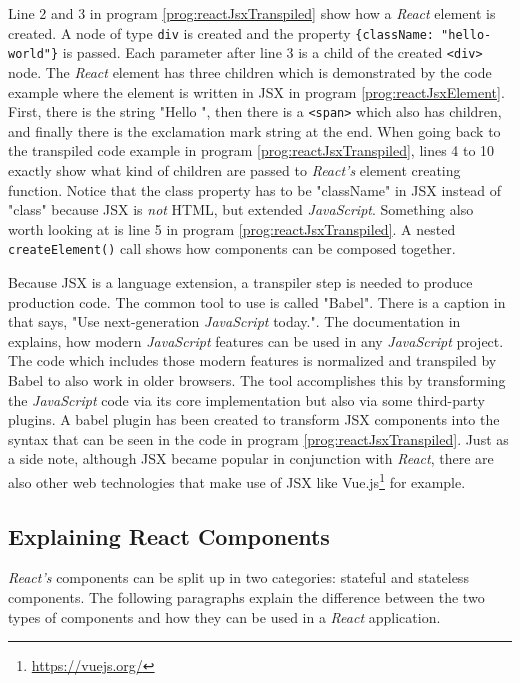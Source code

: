 Line 2 and 3 in program \ref{prog:reactJsxTranspiled} show how a \emph{React} element is created. A node of type \texttt{div} is created and the property \texttt{\{className: "hello-world"\}} is passed. Each parameter after line 3 is a child of the created \texttt{<div>} node. The \emph{React} element has three children which is demonstrated by the code example where the element is written in JSX in program \ref{prog:reactJsxElement}. First, there is the string "Hello ", then there is a \texttt{<span>} which also has children, and finally there is the exclamation mark string at the end. When going back to the transpiled code example in program \ref{prog:reactJsxTranspiled}, lines 4 to 10 exactly show what kind of children are passed to \emph{React's} element creating function. Notice that the class property has to be "className" in JSX instead of "class" because JSX is \emph{not} HTML, but extended \emph{JavaScript}. Something also worth looking at is line 5 in program \ref{prog:reactJsxTranspiled}. A nested \texttt{createElement()} call shows how components can be composed together.

Because JSX is a language extension, a transpiler step is needed to produce production code. The common tool to use is called "Babel". There is a caption in \cite{Babel} that says, "Use next-generation \emph{JavaScript} today.". The documentation in \cite{Babel} explains, how modern \emph{JavaScript} features can be used in any \emph{JavaScript} project. The code which includes those modern features is normalized and transpiled by Babel to also work in older browsers. The tool accomplishes this by transforming the \emph{JavaScript} code via its core implementation but also via some third-party plugins. A babel plugin has been created to transform JSX components into the syntax that can be seen in the code in program \ref{prog:reactJsxTranspiled}. Just as a side note, although JSX became popular in conjunction with \emph{React}, there are also other web technologies that make use of JSX like Vue.js\footnote{\url{https://vuejs.org/}} for example.

\subsection{Explaining React Components}
\label{sec:reactComponents}

\emph{React's} components can be split up in two categories: stateful and stateless components. The following paragraphs explain the difference between the two types of components and how they can be used in a \emph{React} application.

